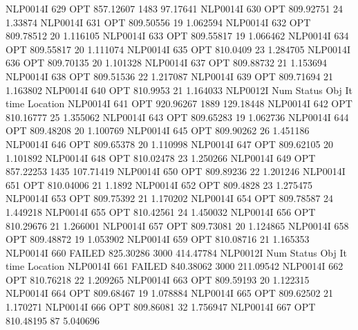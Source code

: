 NLP0014I           629         OPT 857.12607     1483 97.17641
NLP0014I           630         OPT 809.92751       24 1.33874
NLP0014I           631         OPT 809.50556       19 1.062594
NLP0014I           632         OPT 809.78512       20 1.116105
NLP0014I           633         OPT 809.55817       19 1.066462
NLP0014I           634         OPT 809.55817       20 1.111074
NLP0014I           635         OPT 810.0409       23 1.284705
NLP0014I           636         OPT 809.70135       20 1.101328
NLP0014I           637         OPT 809.88732       21 1.153694
NLP0014I           638         OPT 809.51536       22 1.217087
NLP0014I           639         OPT 809.71694       21 1.163802
NLP0014I           640         OPT 810.9953       21 1.164033
NLP0012I 
              Num      Status      Obj             It       time                 Location
NLP0014I           641         OPT 920.96267     1889 129.18448
NLP0014I           642         OPT 810.16777       25 1.355062
NLP0014I           643         OPT 809.65283       19 1.062736
NLP0014I           644         OPT 809.48208       20 1.100769
NLP0014I           645         OPT 809.90262       26 1.451186
NLP0014I           646         OPT 809.65378       20 1.110998
NLP0014I           647         OPT 809.62105       20 1.101892
NLP0014I           648         OPT 810.02478       23 1.250266
NLP0014I           649         OPT 857.22253     1435 107.71419
NLP0014I           650         OPT 809.89236       22 1.201246
NLP0014I           651         OPT 810.04006       21 1.1892
NLP0014I           652         OPT 809.4828       23 1.275475
NLP0014I           653         OPT 809.75392       21 1.170202
NLP0014I           654         OPT 809.78587       24 1.449218
NLP0014I           655         OPT 810.42561       24 1.450032
NLP0014I           656         OPT 810.29676       21 1.266001
NLP0014I           657         OPT 809.73081       20 1.124865
NLP0014I           658         OPT 809.48872       19 1.053902
NLP0014I           659         OPT 810.08716       21 1.165353
NLP0014I           660      FAILED 825.30286     3000 414.47784
NLP0012I 
              Num      Status      Obj             It       time                 Location
NLP0014I           661      FAILED 840.38062     3000 211.09542
NLP0014I           662         OPT 810.76218       22 1.209265
NLP0014I           663         OPT 809.59193       20 1.122315
NLP0014I           664         OPT 809.68467       19 1.078884
NLP0014I           665         OPT 809.62502       21 1.170271
NLP0014I           666         OPT 809.86081       32 1.756947
NLP0014I           667         OPT 810.48195       87 5.040696
